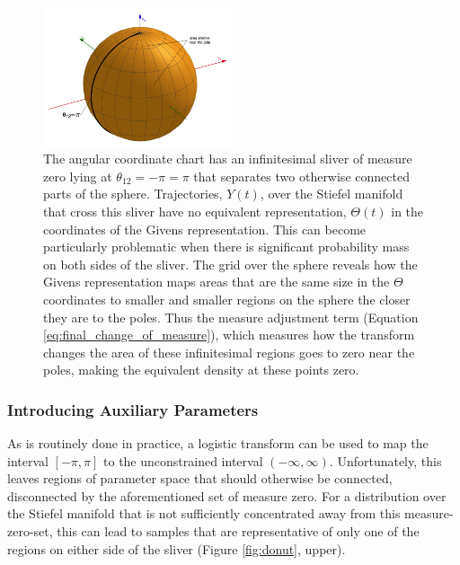 \documentclass[ba]{imsart}
\numberwithin{equation}{section}
\theoremstyle{plain}
\begin{document}
\begin{figure}[h]
\centering
\vspace{.1in}
\includegraphics[width=0.5\textwidth]{figures/sliver_globe.png}
\vspace{.05in}
\caption{The angular coordinate chart has an infinitesimal sliver of measure zero lying at $\theta_{12} = -\pi = \pi$ that separates two otherwise connected parts of the sphere. Trajectories, $Y(t)$, over the Stiefel manifold that cross this sliver have no equivalent representation, $\Theta(t)$ in the coordinates of the Givens representation. This can become particularly problematic when there is significant probability mass on both sides of the sliver. The grid over the sphere reveals how the Givens representation maps areas that are the same size in the $\Theta$ coordinates to smaller and smaller regions on the sphere the closer they are to the poles. Thus the measure adjustment term (Equation \ref{eq:final_change_of_measure}), which measures how the transform changes the area of these infinitesimal regions goes to zero near the poles, making the equivalent density at these points zero.}
\label{fig:pathologies}
\end{figure}

\subsubsection{Introducing Auxiliary Parameters}
\noindent As is routinely done in practice, a logistic transform can be used to map the interval $[-\pi,\pi]$ to the unconstrained interval $(-\infty, \infty)$. Unfortunately, this leaves regions of parameter space that should otherwise be connected, disconnected by the aforementioned set of measure zero. For a distribution over the Stiefel manifold that is not sufficiently concentrated away from this measure-zero-set, this can lead to samples that are representative of only one of the regions on either side of the sliver (Figure \ref{fig:donut}, upper).
\end{document}
